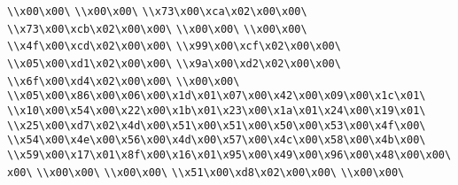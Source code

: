 \verb|\\x00\x00\|\newline
\verb|\\x00\x00\|\newline
\verb|\\x73\x00\xca\x02\x00\x00\|\newline
\verb|\\x73\x00\xcb\x02\x00\x00\|\newline
\verb|\\x00\x00\|\newline
\verb|\\x00\x00\|\newline
\verb|\\x4f\x00\xcd\x02\x00\x00\|\newline
\verb|\\x99\x00\xcf\x02\x00\x00\|\newline
\verb|\\x05\x00\xd1\x02\x00\x00\|\newline
\verb|\\x9a\x00\xd2\x02\x00\x00\|\newline
\verb|\\x6f\x00\xd4\x02\x00\x00\|\newline
\verb|\\x00\x00\|\newline
\verb|\\x05\x00\x86\x00\x06\x00\x1d\x01\x07\x00\x42\x00\x09\x00\x1c\x01\|\newline
\verb|\\x10\x00\x54\x00\x22\x00\x1b\x01\x23\x00\x1a\x01\x24\x00\x19\x01\|\newline
\verb|\\x25\x00\xd7\x02\x4d\x00\x51\x00\x51\x00\x50\x00\x53\x00\x4f\x00\|\newline
\verb|\\x54\x00\x4e\x00\x56\x00\x4d\x00\x57\x00\x4c\x00\x58\x00\x4b\x00\|\newline
\verb|\\x59\x00\x17\x01\x8f\x00\x16\x01\x95\x00\x49\x00\x96\x00\x48\x00\x00\x00\|\newline
\verb|\\x00\x00\|\newline
\verb|\\x00\x00\|\newline
\verb|\\x51\x00\xd8\x02\x00\x00\|\newline
\verb|\\x00\x00\|\newline
